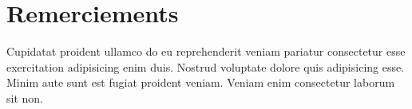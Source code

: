 \chapter*{Remerciements}
Cupidatat proident ullamco do eu reprehenderit veniam pariatur consectetur esse exercitation adipisicing enim duis. Nostrud voluptate dolore quis adipisicing esse. Minim aute sunt est fugiat proident veniam. Veniam enim consectetur laborum sit non.